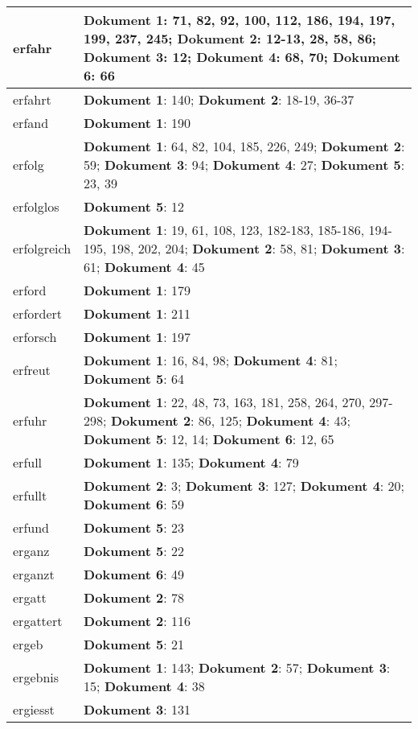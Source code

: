 \documentclass[a5paper]{article}
\begin{document}
\begin{longtable}[l]{|l|p{3in}|}
\hline
erfahr & \textbf{Dokument 1}: 71, 82, 92, 100, 112, 186, 194, 197, 199, 237, 245; \textbf{Dokument 2}: 12-13, 28, 58, 86; \textbf{Dokument 3}: 12; \textbf{Dokument 4}: 68, 70; \textbf{Dokument 6}: 66 \\
\hline
erfahrt & \textbf{Dokument 1}: 140; \textbf{Dokument 2}: 18-19, 36-37 \\
\hline
erfand & \textbf{Dokument 1}: 190 \\
\hline
erfolg & \textbf{Dokument 1}: 64, 82, 104, 185, 226, 249; \textbf{Dokument 2}: 59; \textbf{Dokument 3}: 94; \textbf{Dokument 4}: 27; \textbf{Dokument 5}: 23, 39 \\
\hline
erfolglos & \textbf{Dokument 5}: 12 \\
\hline
erfolgreich & \textbf{Dokument 1}: 19, 61, 108, 123, 182-183, 185-186, 194-195, 198, 202, 204; \textbf{Dokument 2}: 58, 81; \textbf{Dokument 3}: 61; \textbf{Dokument 4}: 45 \\
\hline
erford & \textbf{Dokument 1}: 179 \\
\hline
erfordert & \textbf{Dokument 1}: 211 \\
\hline
erforsch & \textbf{Dokument 1}: 197 \\
\hline
erfreut & \textbf{Dokument 1}: 16, 84, 98; \textbf{Dokument 4}: 81; \textbf{Dokument 5}: 64 \\
\hline
erfuhr & \textbf{Dokument 1}: 22, 48, 73, 163, 181, 258, 264, 270, 297-298; \textbf{Dokument 2}: 86, 125; \textbf{Dokument 4}: 43; \textbf{Dokument 5}: 12, 14; \textbf{Dokument 6}: 12, 65 \\
\hline
erfull & \textbf{Dokument 1}: 135; \textbf{Dokument 4}: 79 \\
\hline
erfullt & \textbf{Dokument 2}: 3; \textbf{Dokument 3}: 127; \textbf{Dokument 4}: 20; \textbf{Dokument 6}: 59 \\
\hline
erfund & \textbf{Dokument 5}: 23 \\
\hline
erganz & \textbf{Dokument 5}: 22 \\
\hline
erganzt & \textbf{Dokument 6}: 49 \\
\hline
ergatt & \textbf{Dokument 2}: 78 \\
\hline
ergattert & \textbf{Dokument 2}: 116 \\
\hline
ergeb & \textbf{Dokument 5}: 21 \\
\hline
ergebnis & \textbf{Dokument 1}: 143; \textbf{Dokument 2}: 57; \textbf{Dokument 3}: 15; \textbf{Dokument 4}: 38 \\
\hline
ergiesst & \textbf{Dokument 3}: 131 \\

\end{longtable}
\end{document}
